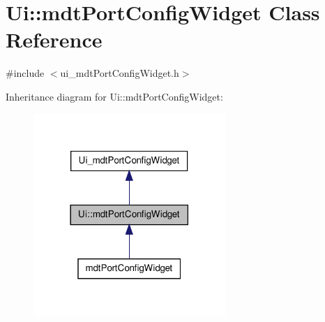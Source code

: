 \hypertarget{class_ui_1_1mdt_port_config_widget}{\section{Ui\-:\-:mdt\-Port\-Config\-Widget Class Reference}
\label{class_ui_1_1mdt_port_config_widget}
}


{\ttfamily \#include $<$ui\-\_\-mdt\-Port\-Config\-Widget.\-h$>$}



Inheritance diagram for Ui\-:\-:mdt\-Port\-Config\-Widget\-:
\nopagebreak
\begin{figure}[H]
\begin{center}
\leavevmode
\includegraphics[width=206pt]{class_ui_1_1mdt_port_config_widget__inherit__graph}
\end{center}
\end{figure}


